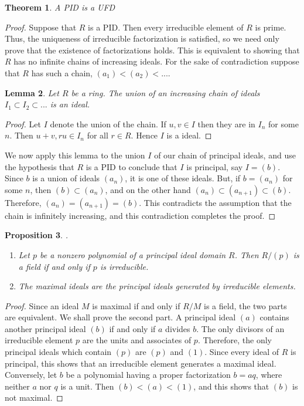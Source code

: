 \documentclass[12pt]{article}
\newtheorem{thm}{Theorem}[section]
\newtheorem{lem}[thm]{Lemma}  %
\newtheorem{prop}[thm]{Proposition}
\theoremstyle{definition}
\theoremstyle{remark}
\numberwithin{equation}{section}
\begin{document}
\begin{thm}
        A PID is a UFD
\end{thm}
\begin{proof}
        Suppose that $R$ is a PID. Then every irreducible element of $R$ is prime. Thus, the uniqueness of irreducible factorization is satisfied, so we need only prove that the existence of factorizations holds. This is equivalent to showing that $R$ has no infinite chains of increasing ideals. For the sake of contradiction suppose that $R$ has such a chain, $(a_1) < (a_2) < ...$.
        \begin{lem}
                Let $R$ be a ring. The union of an increasing chain of ideals $I_1 \subset I_2 \subset ...$ is an ideal.
        \end{lem}
        \begin{proof}
                Let $I$ denote the union of the chain. If $u,v \in I$ then they are in $I_n$ for some $n$. Then $u+v,ru \in I_n$ for all $r \in R$. Hence $I$ is a ideal.
        \end{proof}
        We now apply this lemma to the union $I$ of our chain of principal ideals, and use the hypothesis that $R$ is a PID to conclude that $I$ is principal, say $I = (b)$. Since $b$ is a union of ideals $(a_n)$, it is one of these ideals. But, if $b = (a_n)$ for some $n$, then $(b) \subset (a_n)$, and on the other hand $(a_n) \subset (a_{n+1}) \subset (b)$. Therefore, $(a_n) = (a_{n+1}) = (b)$. This contradicts the assumption that the chain is infinitely increasing, and this contradiction completes the proof.
\end{proof}


\vspace{15pt}

\begin{prop}
        .\newline\begin{enumerate}
                \item Let $p$ be a nonzero polynomial of a principal ideal domain $R$. Then $R/(p)$ is a field if and only if $p$ is irreducible.
                \item The maximal ideals are the principal ideals generated by irreducible elements.
        \end{enumerate}
\end{prop}
\begin{proof}
        Since an ideal $M$ is maximal if and only if $R/M$ is a field, the two parts are equivalent. We shall prove the second part. A principal ideal $(a)$ contains another principal ideal $(b)$ if and only if $a$ divides $b$. The only divisors of an irreducible element $p$ are the units and associates of $p$. Therefore, the only principal ideals which contain $(p)$ are $(p)$ and $(1)$. Since every ideal of $R$ is principal, this shows that an irreducible element generates a maximal ideal. Conversely, let $b$ be a polynomial having a proper factorization $b = aq$, where neither $a$ nor $q$ is a unit. Then $(b) < (a) < (1)$, and this shows that $(b)$ is not maximal.
\end{proof}
\end{document}
